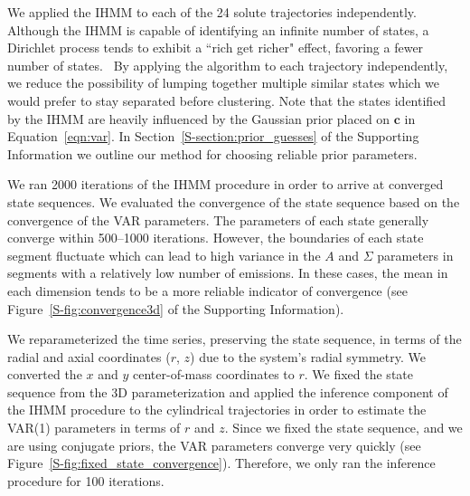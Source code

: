 \documentclass[journal=jpcbfk,manuscript=article]{achemso}
\begin{document}
  We applied the IHMM to each of the 24 solute trajectories independently.
  Although the IHMM is capable of identifying an infinite number of states, 
  a Dirichlet process tends to exhibit a ``rich get richer" effect, favoring
  a fewer number of states.~\cite{dreyer_discovering_2011} By applying the algorithm to each trajectory 
  independently, we reduce the possibility of lumping together multiple 
  similar states which we would prefer to stay separated before clustering.
  Note that the states identified by the IHMM are heavily influenced by 
  the Gaussian prior placed on $\mathbf{c}$ in Equation~\ref{eqn:var}. 
  In Section~\ref{S-section:prior_guesses} of the Supporting Information we 
  outline our method for choosing reliable prior parameters. 

  We ran 2000 iterations of the IHMM procedure in order to arrive at converged 
  state sequences. We evaluated the convergence of the state sequence based on
  the convergence of the VAR parameters. The parameters of each state
  generally converge within 500--1000 iterations. However, the boundaries of 
  each state segment fluctuate which can lead to high variance in the $A$
  and $\Sigma$ parameters in segments with a relatively low number of emissions.
  In these cases, 
  the mean in each dimension tends to be a more reliable indicator of
  convergence (see Figure~\ref{S-fig:convergence3d} of the Supporting Information).
  
  We reparameterized the time series, preserving the state sequence, in terms
  of the radial and axial coordinates ($r$, $z$) 
  due to the system's radial symmetry. We converted the $x$ and 
  $y$ center-of-mass coordinates to $r$. We fixed the state sequence from the 
  3D parameterization and applied the inference component of the IHMM procedure
  to the cylindrical trajectories in order to estimate the VAR(1) parameters in
  terms of $r$ and $z$. Since we fixed the state sequence, and we are using conjugate
  priors, the VAR parameters converge very quickly (see Figure~\ref{S-fig:fixed_state_convergence}).
  Therefore, we only ran the inference procedure for 100 iterations. 
  
\end{document}
